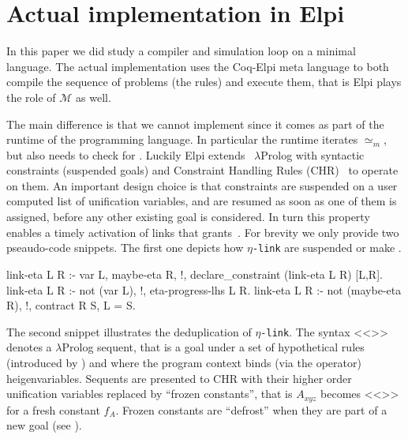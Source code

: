 \documentclass[sigconf,natbib=false,review]{acmart}
\newcommand{\UnifRel}{\ensuremath{\simeq}}
\newcommand{\Ue}{\ensuremath{\UnifRel_m}\xspace}
\newcommand{\llambda}{\ensuremath{\mathcal{L}}\xspace}
\newcommand{\linkMacro}[1]{\ensuremath{#1}\texttt{-link}\xspace}
\newcommand{\linketa} {\linkMacro{\eta}}
\newcommand{\Ho}{\texorpdfstring{\ensuremath{\mathcal{M}}\xspace}{M}}
\begin{document}
%
\section{Actual implementation in Elpi}\label{sec:implementation}

In this paper we did study a compiler and simulation loop on a minimal language.
The actual implementation uses the Coq-Elpi meta language to both compile
the sequence of problems (the rules) and execute them, that is Elpi
plays the role of \Ho{} as well.

The main difference is that we cannot implement \hrun since it comes as part of
the runtime of the programming language. In particular the runtime iterates
\Ue, but \hstep also needs to check for \progress. Luckily Elpi extends~\cite{TASSI_2019}
$\lambda$Prolog with syntactic constraints (suspended goals) and
Constraint Handling Rules (CHR)~\cite{fruehwirth2017constraint} to operate on them.
An important design choice is that constraints are suspended on a user
computed list of unification variables, and are resumed as soon as one of them
is assigned, before any other existing goal is considered. In turn this
property enables a timely activation of links that grants~.
For brevity we only provide two pseaudo-code snippets. The first one depicts
how \linketa are suspended or make \progress.

\begin{elpicode}
link-eta L R :- var L, maybe-eta R, !,
  declare_constraint (link-eta L R) [L,R].
link-eta L R :- not (var L), !, eta-progress-lhs L R.
link-eta L R :- not (maybe-eta R), !, contract R S, L = S.
\end{elpicode}

\noindent
The second snippet illustrates the deduplication of \linketa. The syntax
<<>> denotes a $\lambda$Prolog sequent, that is a 
goal  under a set  of hypothetical rules (introduced
by \elpiIn{=>}) and where the program context binds (via the 
operator)  heigenvariables. Sequents are presented to
CHR with their higher order unification variables replaced by
``frozen constants'', that is $A_{xyz}$ becomes <<>>
for a fresh constant $f_A$. Frozen constants are ``defrost'' when
they are part of a new goal (see \cite[section 4.3]{TASSI_2019}).
\end{document}
